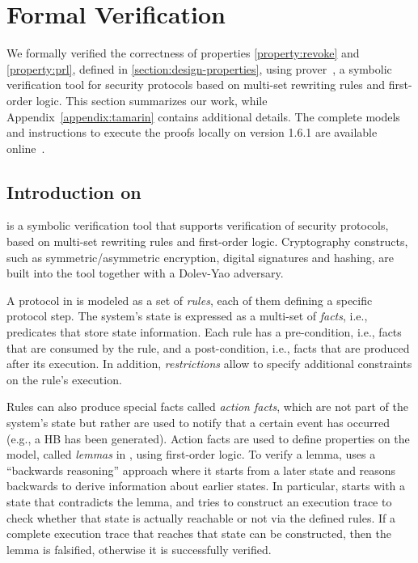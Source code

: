 \section{Formal Verification}
\label{section:design-verification}
%

We formally verified the correctness of properties \ref{property:revoke} and
\ref{property:prl}, defined in \cref{section:design-properties}, using
\tamarin{} prover~\cite{meier2013tamarin}, a symbolic verification tool for
security protocols based on multi-set rewriting rules and first-order logic.
This section summarizes our work, while Appendix~\ref{appendix:tamarin} contains
additional details. The complete models and instructions to
execute the proofs locally on \tamarin{} version 1.6.1 are available
online~\cite{supplMaterial}.

\subsection{Introduction on \tamarin{}}
\label{section:tamarin-intro}

\tamarin{} is a symbolic verification tool that supports verification of
security protocols, based on multi-set rewriting rules and first-order logic.
Cryptography constructs, such as symmetric/asymmetric encryption, digital
signatures and hashing, are built into the tool together with a Dolev-Yao
adversary.

A protocol in \tamarin{} is modeled as a set of \emph{rules}, each of them
defining a specific protocol step. The system's state is expressed as a
multi-set of \emph{facts}, i.e., predicates that store state information. Each
rule has a pre-condition, i.e., facts that are consumed by the rule, and a
post-condition, i.e., facts that are produced after its execution. In addition,
\emph{restrictions} allow to specify additional constraints on the rule's
execution.

Rules can also produce special facts called \emph{action facts}, which are not
part of the system's state but rather are used to notify that a certain event
has occurred (e.g., a \ac{HB} has been generated). Action facts are used to
define properties on the model, called \emph{lemmas} in \tamarin, using
first-order logic. To verify a lemma, \tamarin{} uses a ``backwards reasoning''
approach where it starts from a later state and reasons backwards to derive
information about earlier states. In particular, \tamarin{} starts with a state
that contradicts the lemma, and tries to construct an execution trace to check
whether that state is actually reachable or not via the defined rules. If a
complete execution trace that reaches that state can be constructed, then the
lemma is falsified, otherwise it is successfully verified.

